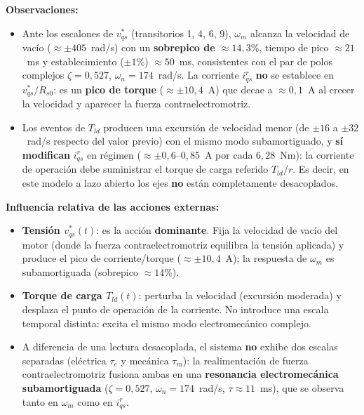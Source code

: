 \documentclass[12pt, a4paper,journal, onecolumn, compsoc]{IEEEtran}
\begin{document}
\textbf{Observaciones:}
\begin{itemize}
    \item Ante los escalones de $v_{qs}^*$ (transitorios 1, 4, 6, 9), $\omega_m$ alcanza la velocidad de vacío ($\approx \pm 405$~rad/s) con un \textbf{sobrepico de $\approx 14{,}3\%$}, tiempo de pico $\approx 21$~ms y establecimiento ($\pm 1\%$) $\approx 50$~ms, consistentes con el par de polos complejos $\zeta = 0{,}527$, $\omega_n = 174$~rad/s. La corriente $i_{qs}^r$ \textbf{no} se establece en $v_{qs}^*/R_{s0}$: es un \textbf{pico de torque} ($\approx \pm 10{,}4$~A) que decae a $\approx 0{,}1$~A al crecer la velocidad y aparecer la fuerza contraelectromotriz.

    \item Los eventos de $T_{ld}$ producen una excursión de velocidad menor (de $\pm 16$ a $\pm 32$~rad/s respecto del valor previo) con el mismo modo subamortiguado, y \textbf{sí modifican} $i_{qs}^r$ en régimen ($\approx \pm 0{,}6$--$0{,}85$~A por cada $6{,}28$~Nm): la corriente de operación debe suministrar el torque de carga referido $T_{ld}/r$. Es decir, en este modelo a lazo abierto los ejes \textbf{no} están completamente desacoplados.
\end{itemize}

\textbf{Influencia relativa de las acciones externas:}

\begin{itemize}
    \item \textbf{Tensión $v_{qs}^*(t)$}: es la acción \textbf{dominante}. Fija la velocidad de vacío del motor (donde la fuerza contraelectromotriz equilibra la tensión aplicada) y produce el pico de corriente/torque ($\approx \pm 10{,}4$~A); la respuesta de $\omega_m$ es subamortiguada (sobrepico $\approx 14\%$).

    \item \textbf{Torque de carga $T_{ld}(t)$}: perturba la velocidad (excursión moderada) y desplaza el punto de operación de la corriente. No introduce una escala temporal distinta: excita el mismo modo electromecánico complejo.

    \item A diferencia de una lectura desacoplada, el sistema \textbf{no} exhibe dos escalas separadas (eléctrica $\tau_e$ y mecánica $\tau_m$): la realimentación de fuerza contraelectromotriz fusiona ambas en una \textbf{resonancia electromecánica subamortiguada} ($\zeta = 0{,}527$, $\omega_n = 174$~rad/s, $\tau \approx 11$~ms), que se observa tanto en $\omega_m$ como en $i_{qs}^r$.
\end{itemize}
\end{document}
